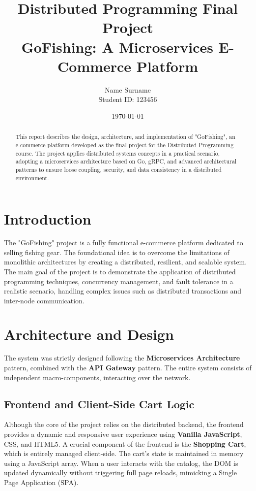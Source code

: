 \documentclass[12pt,a4paper]{article}
\title{\textbf{Distributed Programming Final Project}\\ \Large GoFishing: A Microservices E-Commerce Platform}
\author{Name Surname \\ \small Student ID: 123456}
\date{\today}
\begin{document}
\maketitle

\begin{abstract}
This report describes the design, architecture, and implementation of "GoFishing", an e-commerce platform developed as the final project for the Distributed Programming course. The project applies distributed systems concepts in a practical scenario, adopting a microservices architecture based on Go, gRPC, and advanced architectural patterns to ensure loose coupling, security, and data consistency in a distributed environment.
\end{abstract}

\tableofcontents
\newpage

\section{Introduction}
The "GoFishing" project is a fully functional e-commerce platform dedicated to selling fishing gear. The foundational idea is to overcome the limitations of monolithic architectures by creating a distributed, resilient, and scalable system.
The main goal of the project is to demonstrate the application of distributed programming techniques, concurrency management, and fault tolerance in a realistic scenario, handling complex issues such as distributed transactions and inter-node communication.

\section{Architecture and Design}
The system was strictly designed following the \textbf{Microservices Architecture} pattern, combined with the \textbf{API Gateway} pattern. The entire system consists of independent macro-components, interacting over the network.

\subsection{Frontend and Client-Side Cart Logic}
Although the core of the project relies on the distributed backend, the frontend provides a dynamic and responsive user experience using \textbf{Vanilla JavaScript}, CSS, and HTML5.
A crucial component of the frontend is the \textbf{Shopping Cart}, which is entirely managed client-side. The cart's state is maintained in memory using a JavaScript array. When a user interacts with the catalog, the DOM is updated dynamically without triggering full page reloads, mimicking a Single Page Application (SPA).
\end{document}
